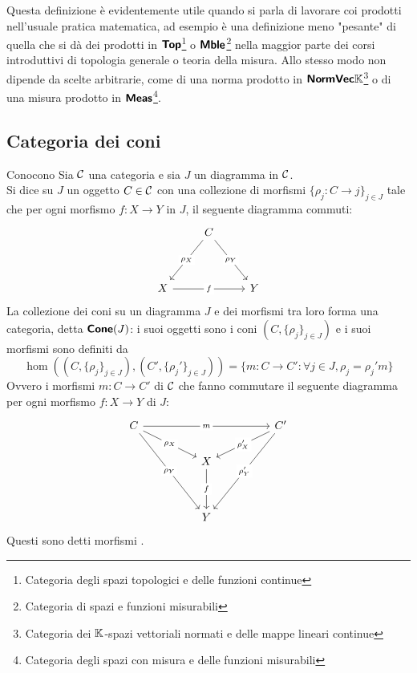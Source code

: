 \documentclass{article}
\renewcommand\C{\mc{C}}
\begin{document}
Questa definizione è evidentemente utile quando si parla di lavorare coi prodotti nell'usuale pratica matematica, ad esempio è una definizione meno "pesante" di quella che si dà dei prodotti in $\text{\sffamily\textbf{Top}}$\footnote{Categoria degli spazi topologici e delle funzioni continue} o $\text{\sffamily\textbf{Mble}}$\footnote{Categoria di spazi e funzioni misurabili} nella maggior parte dei corsi introduttivi di topologia generale o teoria della misura. Allo stesso modo non dipende da scelte arbitrarie, come di una norma prodotto in $\text{\sffamily\textbf{NormVec}}\mathbb{K}$\footnote{Categoria dei $\mathbb{K}$-spazi vettoriali normati e delle mappe lineari continue} o di una misura prodotto in $\text{\sffamily\textbf{Meas}}$\footnote{Categoria degli spazi con misura e delle funzioni misurabili}.

\subsection{Categoria dei coni}

\begin{definition}{Cono}{cono}
    Sia $\C$ una categoria e sia $J$ un diagramma in $\C$.\\
    Si dice  su $J$ un oggetto $C \in \C$ con una collezione di morfismi $\{\rho_j : C \to j\}_{j \in J}$ tale che per ogni morfismo $f : X\to Y$ in $J$, il seguente diagramma commuti:
    \[\begin{tikzcd}
	    & C \\
	    \\
	    X && Y
	    \arrow["{\rho_X}"{description}, from=1-2, to=3-1]
	    \arrow["{\rho_Y}"{description}, from=1-2, to=3-3]
	    \arrow["f"{description}, from=3-1, to=3-3]
    \end{tikzcd}\]
    La collezione dei coni su un diagramma $J$ e dei morfismi tra loro forma una categoria, detta $\text{\sffamily\textbf{Cone}}(J)$: i suoi oggetti sono i coni $(C,\{\rho_j\}_{j \in J})$ e i suoi morfismi sono definiti da 
    \[ \hom((C,\{\rho_j\}_{j \in J}), (C',\{\rho_j'\}_{j \in J})) = \{m : C\to C' : \forall j \in J, \rho_j = \rho_j' m\}\]
    Ovvero i morfismi $m:C\to C'$ di $\C$ che fanno commutare il seguente diagramma per ogni morfismo $f:X\to Y$ di $J$:
    \[\begin{tikzcd}
	    C &&&& {C'} \\
	    && X \\
    	\\
    	&& Y
    	\arrow["m"{description}, from=1-1, to=1-5]
    	\arrow["{\rho_X}"{description}, from=1-1, to=2-3]
    	\arrow["{\rho_Y}"{description}, from=1-1, to=4-3]
    	\arrow["{\rho_X'}"{description}, from=1-5, to=2-3]
    	\arrow["{\rho_Y'}"{description}, from=1-5, to=4-3]
	    \arrow["f"{description}, from=2-3, to=4-3]
    \end{tikzcd}\]
    Questi sono detti morfismi .
\end{definition}
\end{document}
